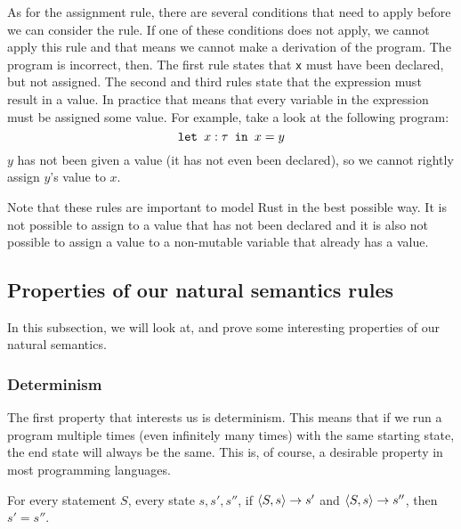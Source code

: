 As for the assignment rule, there are several conditions that need to apply before we can consider the rule. If one of these conditions does not apply, we cannot apply this rule and that means we cannot make a derivation of the program. The program is incorrect, then. The first rule states that \verb|x| must have been declared, but not assigned. The second and third rules state that the expression must result in a value. In practice that means that every variable in the expression must be assigned some value. 
For example, take a look at the following program:
$$\texttt{let }x : \tau \texttt{ in } x=y$$ 
$y$ has not been given a value (it has not even been declared), so we cannot rightly assign $y$'s value to $x$. 

Note that these rules are important to model Rust in the best possible way. It is not possible to assign to a value that has not been declared and it is also not possible to assign a value to a non-mutable variable that already has a value. 

\subsection{Properties of our natural semantics rules}
In this subsection, we will look at, and prove some interesting properties of our natural semantics. 

\subsubsection*{Determinism}

The first property that interests us is determinism. This means that if we run a program multiple times (even infinitely many times) with the same starting state, the end state will always be the same. This is, of course, a desirable property in most programming languages.

\begin{theorem}
For every statement $S$, every state $s, s', s''$, if $\langle S, s \rangle \to s'$ and $\langle S, s \rangle \to s''$, then $s' = s''$.
\end{theorem}

